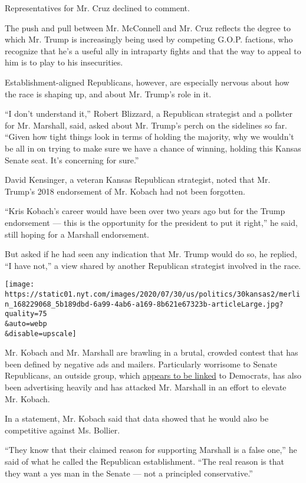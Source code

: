 Representatives for Mr. Cruz declined to comment.

The push and pull between Mr. McConnell and Mr. Cruz reflects the degree
to which Mr. Trump is increasingly being used by competing G.O.P.
factions, who recognize that he's a useful ally in intraparty fights and
that the way to appeal to him is to play to his insecurities.

Establishment-aligned Republicans, however, are especially nervous about
how the race is shaping up, and about Mr. Trump's role in it.

``I don't understand it,'' Robert Blizzard, a Republican strategist and
a pollster for Mr. Marshall, said, asked about Mr. Trump's perch on the
sidelines so far. ``Given how tight things look in terms of holding the
majority, why we wouldn't be all in on trying to make sure we have a
chance of winning, holding this Kansas Senate seat. It's concerning for
sure.''

David Kensinger, a veteran Kansas Republican strategist, noted that Mr.
Trump's 2018 endorsement of Mr. Kobach had not been forgotten.

``Kris Kobach's career would have been over two years ago but for the
Trump endorsement --- this is the opportunity for the president to put
it right,'' he said, still hoping for a Marshall endorsement.

But asked if he had seen any indication that Mr. Trump would do so, he
replied, ``I have not,'' a view shared by another Republican strategist
involved in the race.

\texttt{[image: https://static01.nyt.com/images/2020/07/30/us/politics/30kansas2/merlin\_168229068\_5b189dbd-6a99-4ab6-a169-8b621e67323b-articleLarge.jpg?quality=75\\\&auto=webp\\\&disable=upscale]}

Mr. Kobach and Mr. Marshall are brawling in a brutal, crowded contest
that has been defined by negative ads and mailers. Particularly
worrisome to Senate Republicans, an outside group, which
\href{https://www.kansascity.com/news/politics-government/article244514962.html}{appears
to be linked} to Democrats, has also been advertising heavily and has
attacked Mr. Marshall in an effort to elevate Mr. Kobach.

In a statement, Mr. Kobach said that data showed that he would also be
competitive against Ms. Bollier.

``They know that their claimed reason for supporting Marshall is a false
one,'' he said of what he called the Republican establishment. ``The
real reason is that they want a yes man in the Senate --- not a
principled conservative.''

